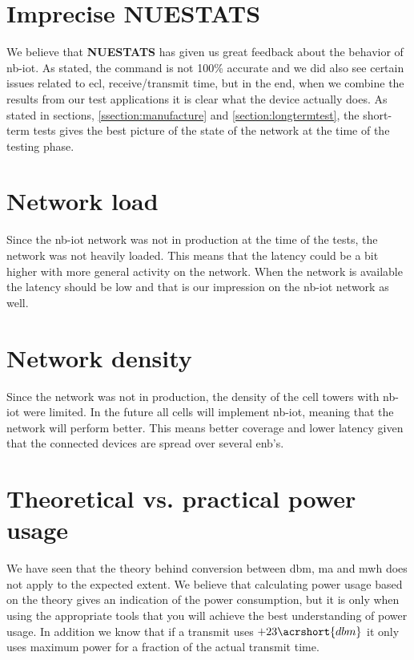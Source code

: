 \documentclass[USenglish]{ifimaster}  %
\begin{document}
\section{Imprecise \textbf{NUESTATS}}
We believe that \textbf{NUESTATS} has given us great feedback about the behavior of \acrshort{nb-iot}. As stated, the command is not 100\% accurate and we did also see certain issues related to \acrshort{ecl}, receive/transmit time, but in the end, when we combine the results from our test applications it is clear what the device actually does. As stated in sections, \vref{ssection:manufacture} and \vref{section:longtermtest}, the short-term tests gives the best picture of the state of the network at the time of the testing phase.

\section{Network load}
Since the \acrshort{nb-iot} network was not in production at the time of the tests, the network was not heavily loaded. This means that the latency could be a bit higher with more general activity on the network. When the network is available the latency should be low and that is our impression on the \acrshort{nb-iot} network as well.

\section{Network density}
Since the network was not in production, the density of the cell towers with \acrshort{nb-iot} were limited. In the future all cells will implement \acrshort{nb-iot}, meaning that the network will perform better. This means better coverage and lower latency given that the connected devices are spread over several \acrshort{enb}'s.

\section{Theoretical vs. practical power usage}
We have seen that the theory behind conversion between \acrshort{dbm}, \acrshort{ma} and \acrshort{mwh} does not apply to the expected extent. We believe that calculating power usage based on the theory gives an indication of the power consumption, but it is only when using the appropriate tools that you will achieve the best understanding of power usage. In addition we know that if a transmit uses ${+23 \acrshort{dbm}}$ it only uses maximum power for a fraction of the actual transmit time.
\end{document}
